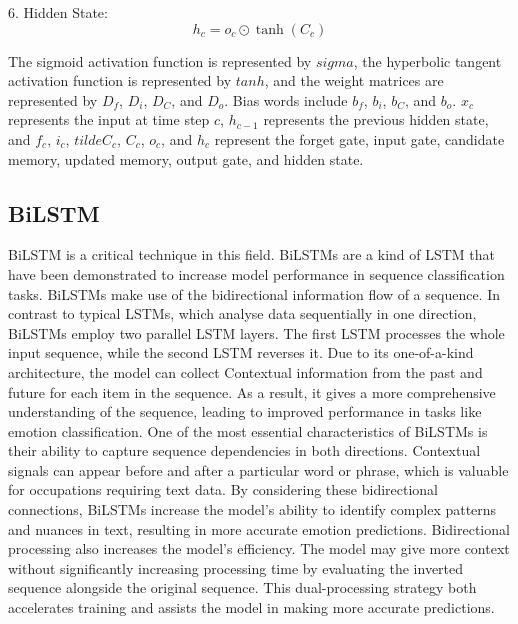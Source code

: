 6. Hidden State:
\begin{equation}
h_c = o_c \odot \tanh(C_c)
\end{equation}

The sigmoid activation function is represented by $sigma$, the hyperbolic tangent activation function is represented by $tanh$, and the weight matrices are represented by $D_f$, $D_i$, $D_C$, and $D_o$. Bias words include $b_f$, $b_i$, $b_C$, and $b_o$. $x_c$ represents the input at time step $c$, $h_{c-1}$ represents the previous hidden state, and $f_c$, $i_c$, $tilde{C}_c$, $C_c$, $o_c$, and $h_c$ represent the forget gate, input gate, candidate memory, updated memory, output gate, and hidden state.







\subsection{BiLSTM}
BiLSTM is a critical technique in this field. BiLSTMs are a kind of LSTM that have been demonstrated to increase model performance in sequence classification tasks. BiLSTMs make use of the bidirectional information flow of a sequence. In contrast to typical LSTMs, which analyse data sequentially in one direction, BiLSTMs employ two parallel LSTM layers. The first LSTM processes the whole input sequence, while the second LSTM reverses it. Due to its one-of-a-kind architecture, the model can collect Contextual information from the past and future for each item in the sequence. As a result, it gives a more comprehensive understanding of the sequence, leading to improved performance in tasks like emotion classification\cite{heidari2020short,rajabi2020multi,joshi2022deep}. One of the most essential characteristics of BiLSTMs is their ability to capture sequence dependencies in both directions. Contextual signals can appear before and after a particular word or phrase, which is valuable for occupations requiring text data. By considering these bidirectional connections, BiLSTMs increase the model's ability to identify complex patterns and nuances in text, resulting in more accurate emotion predictions. Bidirectional processing also increases the model's efficiency. The model may give more context without significantly increasing processing time by evaluating the inverted sequence alongside the original sequence. This dual-processing strategy both accelerates training and assists the model in making more accurate predictions\cite{wang2011solar}.



